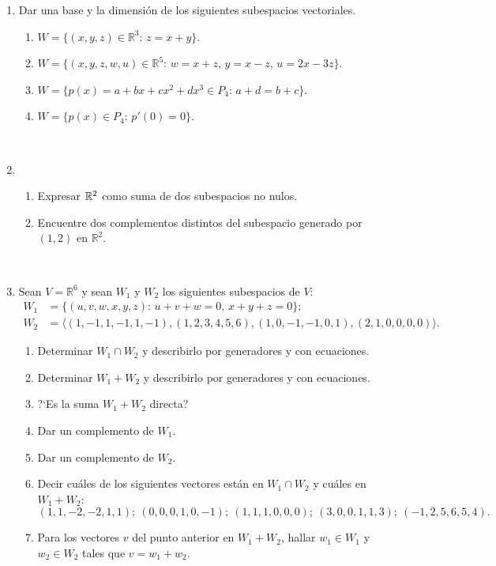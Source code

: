\documentclass[11pt,spanish,makeidx]{amsbook}
\newcommand\R{\mathbb{R}}
\newcommand \gen[1] {\langle #1 \rangle}
\begin{document}
\begin{enumerate}
		\
			
		\item  Dar una base y la dimensi\'on de los siguientes subespacios vectoriales.
		\begin{enumerate}
			\item $W=\{(x,y,z) \in \R^3 :\, z = x + y \}$.
			\item $W = \{(x,y,z,w,u) \in \R^5 :\, w = x + z,\, y = x - z,\, u = 2x - 3z \}$.
			\item $W = \{ p(x)=a+bx+cx^2+dx^3\in P_4:\, a+d=b+c \}$.
			\item $W= \{ p(x)\in P_4:\, p'(0)=0 \}$.
		\end{enumerate}
			
		\
		
	\item
	\begin{enumerate}
		\item
		Expresar ${\Bbb R}^2$ como suma de dos subespacios no nulos.
		\item
		Encuentre dos complementos distintos del subespacio generado por $(1,2)$ en ${\R}^2$.
	\end{enumerate}
		
	\
	
	\item Sean $V=\R^6$ y sean $W_1$ y $W_2$ los siguientes subespacios de $V$:
	\begin{align*}
	W_1 &= \{ (u,v,w,x,y,z):\, u+v+w=0,\, x+y+z=0\};  \\
	W_2 &= \gen{(1,-1,1,-1,1,-1),(1,2,3,4,5,6),(1,0,-1,-1,0,1),(2,1,0,0,0,0)}.
	\end{align*}
	\begin{enumerate}
		\item  Determinar $W_1 \cap W_2$ y describirlo por generadores y con ecuaciones.
		\item  Determinar $W_1+W_2$ y describirlo por generadores y con ecuaciones.
		\item  ?`Es la suma $W_1+W_2$ directa?
		\item  Dar un complemento de $W_1$.
		\item  Dar un complemento de $W_2$.
		\item  Decir cu\'ales de los siguientes vectores est\'an en $W_1\cap W_2$ y cu\'ales en $W_1+W_2$:
		\[ (1,1,-2,-2,1,1);\ (0,0,0,1,0,-1);\ (1,1,1,0,0,0);\ (3,0,0,1,1,3);\ (-1,2,5,6,5,4). \]
		\item Para los vectores $v$ del punto anterior en $W_1+W_2$,  hallar $w_1\in W_1$ y $w_2\in W_2$ tales que $v=w_1+w_2$.
	\end{enumerate}
		

\end{enumerate}
\end{document}
